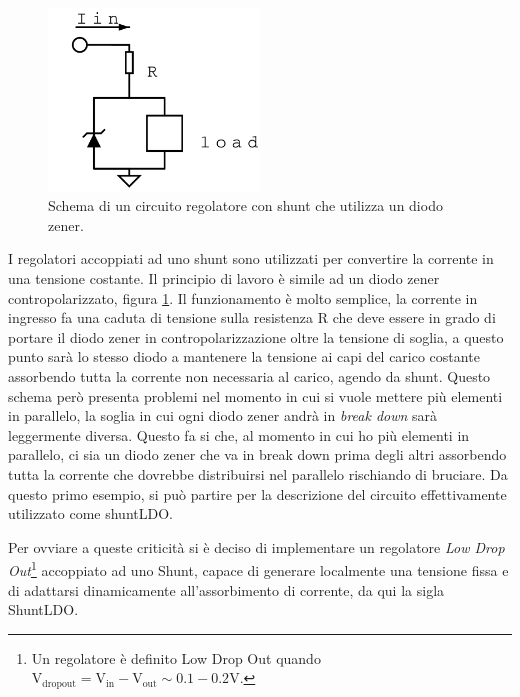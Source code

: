 \begin{figure}
\centering
\includegraphics[width=0.5\textwidth]{Immagini/zener2}
\caption{Schema di un circuito regolatore con shunt che utilizza un diodo zener.}
\label{zener}
\end{figure}
I regolatori accoppiati ad uno shunt sono utilizzati per convertire la corrente in una tensione costante. Il principio di lavoro è simile ad un diodo zener contropolarizzato, figura \ref{zener}. 
Il funzionamento è molto semplice, la corrente in ingresso fa una caduta di tensione sulla resistenza R  che deve essere in grado di portare il diodo zener in contropolarizzazione oltre la tensione di soglia, a questo punto sarà lo stesso diodo a mantenere la tensione ai capi del carico costante assorbendo tutta la corrente non necessaria al carico, agendo da shunt. 
Questo schema però presenta problemi nel momento in cui si vuole mettere più elementi in parallelo, la soglia in cui ogni diodo zener andrà in \textit{break down} sarà leggermente diversa. 
Questo fa si che, al momento in cui ho più elementi in parallelo, ci sia un diodo zener che va in break down prima degli altri assorbendo tutta la corrente che dovrebbe distribuirsi nel parallelo rischiando di bruciare. 
Da questo primo esempio, si può partire per la descrizione del circuito effettivamente utilizzato come shuntLDO. 

Per ovviare a queste criticità si è deciso di implementare un regolatore \textit{Low Drop Out}\footnote{Un regolatore è definito Low Drop Out quando $\mathrm{V_{dropout}=V_{in}-V_{out}\sim 0.1-0.2 V}$.} accoppiato ad uno Shunt, capace di generare localmente una tensione fissa e di adattarsi dinamicamente all'assorbimento di corrente, da qui la sigla ShuntLDO.




